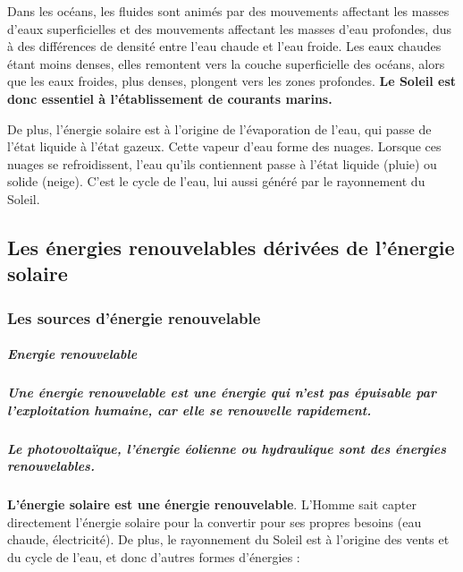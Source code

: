 Dans les océans, les fluides sont animés par des mouvements affectant
les masses d'eaux superficielles et des mouvements affectant les masses
d'eau profondes, dus à des différences de densité entre l'eau chaude et
l'eau froide. Les eaux chaudes étant moins denses, elles remontent vers
la couche superficielle des océans, alors que les eaux froides, plus
denses, plongent vers les zones profondes. \textbf{Le Soleil est donc
essentiel à l'établissement de courants marins.}

De plus, l'énergie solaire est à l'origine de l'évaporation de l'eau,
qui passe de l'état liquide à l'état gazeux. Cette vapeur d'eau forme
des nuages. Lorsque ces nuages se refroidissent, l'eau qu'ils
contiennent passe à l'état liquide (pluie) ou solide (neige). C'est le
cycle de l'eau, lui aussi généré par le rayonnement du Soleil.


  \subsection{Les énergies renouvelables dérivées de l'énergie
  solaire}\label{les-uxe9nergies-renouvelables-duxe9rivuxe9es-de-luxe9nergie-solaire}

 
    \subsubsection{Les sources d'énergie
    renouvelable}\label{les-sources-duxe9nergie-renouvelable}
 
\subparagraph{Energie renouvelable}\label{energie-renouvelable}

\subparagraph{Une énergie renouvelable est une énergie qui n'est pas
épuisable par l'exploitation humaine, car elle se renouvelle
rapidement.}\label{une-uxe9nergie-renouvelable-est-une-uxe9nergie-qui-nest-pas-uxe9puisable-par-lexploitation-humaine-car-elle-se-renouvelle-rapidement.}

\subparagraph{Le photovoltaïque, l'énergie éolienne ou hydraulique sont
des énergies
renouvelables.}\label{le-photovoltauxefque-luxe9nergie-uxe9olienne-ou-hydraulique-sont-des-uxe9nergies-renouvelables.}

\textbf{L'énergie solaire est une énergie renouvelable}. L'Homme sait
capter directement l'énergie solaire pour la convertir pour ses propres
besoins (eau chaude, électricité). De plus, le rayonnement du Soleil est
à l'origine des vents et du cycle de l'eau, et donc d'autres formes
d'énergies :


